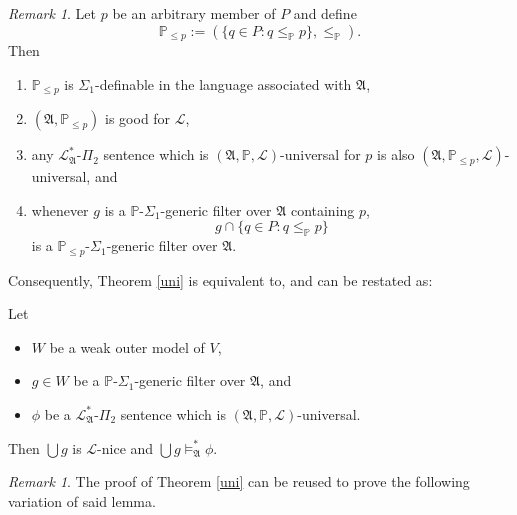 \documentclass[12pt, twoside]{memoir}
\numberwithin{equation}{section}
\theoremstyle{definition}
\theoremstyle{remark}
\newtheorem{rem}[thm]{Remark}
\theoremstyle{definition}
\theoremstyle{definition}
\newenvironment{customlem}[1]
  {\renewcommand\theinnercustomlem{#1}\innercustomlem}
  {\endinnercustomlem}
\theoremstyle{definition}
\theoremstyle{remark}
\begin{document}
\begin{rem}\label{endremmain}
Let $p$ be an arbitrary member of $P$ and define $$\mathbb{P}_{\leq p} := (\{q \in P : q \leq_{\mathbb{P}} p\}, \leq_{\mathbb{P}}).$$ Then 
\begin{enumerate}[label=(\arabic*)]
    \item $\mathbb{P}_{\leq p}$ is $\Sigma_1$-definable in the language associated with $\mathfrak{A}$, 
    \item $(\mathfrak{A}, \mathbb{P}_{\leq p})$ is good for $\mathcal{L}$, 
    \item any $\mathcal{L}^{*}_{\mathfrak{A}}$-$\Pi_2$ sentence which is $(\mathfrak{A}, \mathbb{P}, \mathcal{L})$-universal for $p$ is also $(\mathfrak{A}, \mathbb{P}_{\leq p}, \mathcal{L})$-universal, and
    \item whenever $g$ is a $\mathbb{P}$-$\Sigma_1$-generic filter over $\mathfrak{A}$ containing $p$, $$g \cap \{q \in P : q \leq_{\mathbb{P}} p\}$$ is a $\mathbb{P}_{\leq p}$-$\Sigma_1$-generic filter over $\mathfrak{A}$.
\end{enumerate}
Consequently, Theorem \ref{uni} is equivalent to, and can be restated as:
\end{rem}

\begin{customlem}{5.2.6$'$}\label{lem329p}
Let 
\begin{itemize} 
    \item $W$ be a weak outer model of $V$,
    \item $g \in W$ be a $\mathbb{P}$-$\Sigma_1$-generic filter over $\mathfrak{A}$, and
    \item $\phi$ be a $\mathcal{L}^{*}_{\mathfrak{A}}$-$\Pi_2$ sentence which is $(\mathfrak{A}, \mathbb{P}, \mathcal{L})$-universal.
\end{itemize} 
Then $\bigcup g$ is $\mathcal{L}$-nice and $\bigcup g \models^{*}_{\mathfrak{A}} \phi$.
\end{customlem}

\begin{rem}\label{rem331}
The proof of Theorem \ref{uni} can be reused to prove the following variation of said lemma.
\end{rem}
\end{document}
